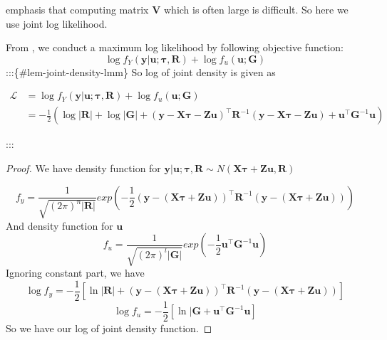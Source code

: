 \documentclass[
  a4paper,
  oneside,
  openany,
  12pt,
  onecolumn]{book}
\theoremstyle{plain}
\theoremstyle{definition}
\theoremstyle{remark}
\begin{document}
\citet{henderson1959estimation} emphasis that computing matrix
\(\boldsymbol{V}\) which is often large is difficult. So here we use
joint log likelihood.

From \citet{butler2013optimal}, we conduct a maximum log likelihood by
following objective function: \[
\log f_Y(\boldsymbol{y}|\boldsymbol{u};\boldsymbol{\tau},\boldsymbol{R})+\log f_u(\boldsymbol{u};\boldsymbol{G})
\] :::\{\#lem-joint-density-lmm\} So log of joint density is given as

\begin{align*}
\mathscr{L}&=\log f_Y(\boldsymbol{y}|\boldsymbol{u};\boldsymbol{\tau},\boldsymbol{R})+\log f_u(\boldsymbol{u};\boldsymbol{G})\\
&=-\frac{1}{2}\left(\log|\boldsymbol{R}|+\log|\boldsymbol{G}|+(\boldsymbol{y}-\boldsymbol{X}\boldsymbol{\tau}-\boldsymbol{Z}\boldsymbol{u})^\top \mathbf{R}^{-1}(\boldsymbol{y}-\boldsymbol{X}\boldsymbol{\tau}-\boldsymbol{Z}\boldsymbol{u})+\boldsymbol{u}^\top\boldsymbol{G}^{-1}\boldsymbol{u}\right)
\end{align*}

:::

\begin{proof}
We have density function for
\(\boldsymbol{y}|\boldsymbol{u};\boldsymbol{\tau},\boldsymbol{R}\sim N(\boldsymbol{X}\boldsymbol{\tau}+\boldsymbol{Z}\boldsymbol{u},\boldsymbol{R})\)

\[
f_y = \frac{1}{\sqrt{(2\pi)^{n}|\boldsymbol{R}|}}exp(-\frac{1}{2}(\boldsymbol{y}-(\boldsymbol{X}\boldsymbol{\tau}+\boldsymbol{Z}\boldsymbol{u}))^\top\boldsymbol{R}^{-1}(\boldsymbol{y}-(\boldsymbol{X}\boldsymbol{\tau}+\boldsymbol{Z}\boldsymbol{u})))
\] And density function for \(\boldsymbol{u}\) \[
f_u = \frac{1}{\sqrt{(2\pi)^{l}|\boldsymbol{G}|}}exp(-\frac{1}{2}\boldsymbol{u}^\top\boldsymbol{G}^{-1}\boldsymbol{u})
\] Ignoring constant part, we have \[
\log f_y=-\frac{1}{2}[\ln |\boldsymbol{R}|+(\boldsymbol{y}-(\boldsymbol{X}\boldsymbol{\tau}+\boldsymbol{Z}\boldsymbol{u}))^\top\boldsymbol{R}^{-1}(\boldsymbol{y}-(\boldsymbol{X}\boldsymbol{\tau}+\boldsymbol{Z}\boldsymbol{u}))]
\] \[
\log f_u = -\frac{1}{2}[\ln |\boldsymbol{G}+\boldsymbol{u}^\top\boldsymbol{G}^{-1}\boldsymbol{u}]
\] So we have our log of joint density function.
\end{proof}
\end{document}
